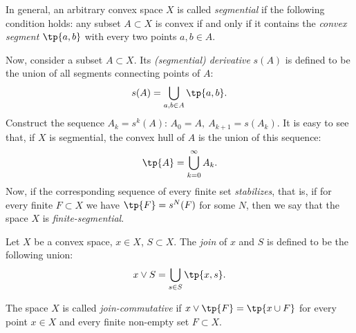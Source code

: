 \documentclass[12pt, a4paper]{article}
\begin{document}
\begin{definition}\label{def-segm}
    In general, an arbitrary convex space \(X\) is called \textit{segmential} if the following condition holds: any subset \(A \subset X\) is convex if and only if it contains the \textit{convex segment} \(\tp{a, b}\) with every two points \(a, b \in A\).

    Now, consider a subset \(A \subset X\). Its \textit{(segmential) derivative} \(s(A)\) is defined to be the union of all segments connecting points of \(A\): \[s(A) = \bigcup_{a, b \in A} \tp{a, b}.\] Construct the sequence \(A_k = s^k(A)\): \(A_0 = A, \ A_{k+1} = s(A_k)\). It is easy to see that, if \(X\) is segmential, the convex hull of \(A\) is the union of this sequence: \[\tp{A} = \bigcup_{k = 0}^{\infty} A_k.\] Now, if the corresponding sequence of every finite set \textit{stabilizes}, that is, if for every finite \(F \subset X\) we have \(\tp{F} = s^N(F)\) for some \(N\), then we say that the space \(X\) is \textit{finite-segmential}.
\end{definition}

\begin{definition}\label{def-join}
    Let \(X\) be a convex space, \(x \in X\), \(S \subset X\). The \textit{join} of \(x\) and \(S\) is defined to be the following union: \[x \vee S = \bigcup_{s \in S} \tp{x, s}.\]

    The space \(X\) is called \textit{join-commutative} if \(x \vee \tp{F} = \tp{x \cup F}\) for every point \(x \in X\) and every finite non-empty set \(F \subset X\).
\end{definition}
\end{document}
